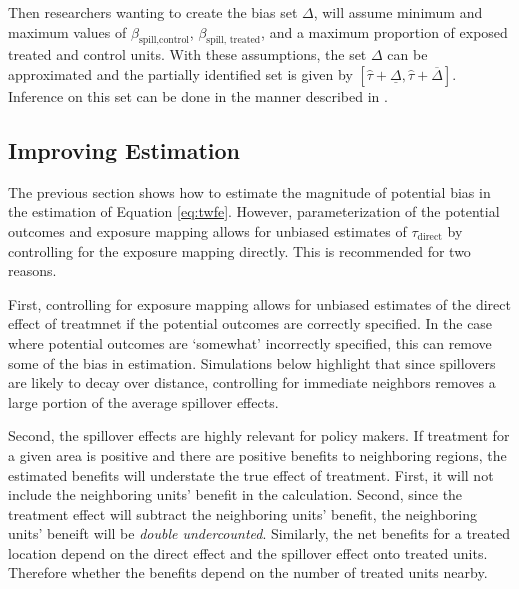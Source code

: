\documentclass[11pt]{article}
\begin{document}
Then researchers wanting to create the bias set $\Delta$, will assume minimum and maximum values of $\beta_{\text{spill,control}}$, $\beta_{\text{spill, treated}}$, and a maximum proportion of exposed treated and control units. With these assumptions, the set $\Delta$ can be approximated and the partially identified set is given by $[\hat{\tau} + \underline{\Delta}, \hat{\tau} + \overline{\Delta}]$. Inference on this set can be done in the manner described in \citet{Rambachan_Roth_2020}. 


\subsection{Improving Estimation}

The previous section shows how to estimate the magnitude of potential bias in the estimation of Equation \ref{eq:twfe}. However, parameterization of the potential outcomes and exposure mapping allows for unbiased estimates of $\tau_{\text{direct}}$ by controlling for the exposure mapping directly. This is recommended for two reasons. 

First, controlling for exposure mapping allows for unbiased estimates of the direct effect of treatmnet if the potential outcomes are correctly specified. In the case where potential outcomes are `somewhat' incorrectly specified, this can remove some of the bias in estimation. Simulations below highlight that since spillovers are likely to decay over distance, controlling for immediate neighbors removes a large portion of the average spillover effects.

Second, the spillover effects are highly relevant for policy makers. If treatment for a given area is positive and there are positive benefits to neighboring regions, the estimated benefits will understate the true effect of treatment. First, it will not include the neighboring units' benefit in the calculation. Second, since the treatment effect will subtract the neighboring units' benefit, the neighboring units' beneift will be \emph{double undercounted}. Similarly, the net benefits for a treated location depend on the direct effect and the spillover effect onto treated units. Therefore whether the benefits depend on the number of treated units nearby.





\end{document}
